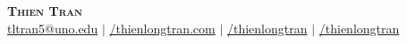 \documentclass[letterpaper,11pt]{article}
\begin{document}
\def \linkedinlink {https://www.linkedin.com/in/thienlongtran}
\def \linkedintext {/thienlongtran}

\def \emaillink {mailto:tltran5@uno.edu}
\def \emailtext {tltran5@uno.edu}

\def \githublink {https://github.com/thienlongtran}
\def \githubtext {/thienlongtran}

\def \websitelink {https://www.thienlongtran.com/}
\def \websitetext {/thienlongtran.com}

\def \linkedin {\hspace{3pt}\href{\linkedinlink}{\linkedintext}}
\def \email {\hspace{3pt}\href{\emaillink}{\emailtext}}
\def \github {\hspace{3pt}\href{\githublink}{\githubtext}}
\def \website {\hspace{3pt}\href{\websitelink}{\websitetext}}



\begin{center}
    \textbf{\Huge \scshape Thien Tran} \\ \vspace{1pt}
    \emailicon {\faEnvelope} 
    \textcolor{LinkColor}{\email} $|$ 
    \websiteicon {\faGlobe}
    \textcolor{LinkColor}{\website} $|$
    \linkedinicon {\faLinkedin}
    \textcolor{LinkColor}{\linkedin} $|$
    \githubicon {\faGithub}
    \textcolor{LinkColor}{\github}
\end{center}


\end{document}
